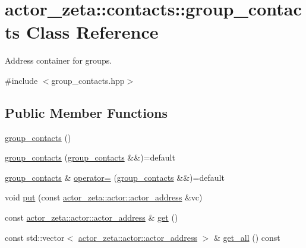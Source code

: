 \hypertarget{classactor__zeta_1_1contacts_1_1group__contacts}{}\section{actor\+\_\+zeta\+:\+:contacts\+:\+:group\+\_\+contacts Class Reference}
\label{classactor__zeta_1_1contacts_1_1group__contacts}


Address container for groups.  




{\ttfamily \#include $<$group\+\_\+contacts.\+hpp$>$}

\subsection*{Public Member Functions}
\begin{DoxyCompactItemize}
\item 
\hyperlink{classactor__zeta_1_1contacts_1_1group__contacts_a01b1a7dc05a2242d6d30a87e3e3e9ebc}{group\+\_\+contacts} ()
\item 
\hyperlink{classactor__zeta_1_1contacts_1_1group__contacts_a8dced15cc60b2e5aa63ac62902ead8c0}{group\+\_\+contacts} (\hyperlink{classactor__zeta_1_1contacts_1_1group__contacts}{group\+\_\+contacts} \&\&)=default
\item 
\hyperlink{classactor__zeta_1_1contacts_1_1group__contacts}{group\+\_\+contacts} \& \hyperlink{classactor__zeta_1_1contacts_1_1group__contacts_ae52bb816fc7f87a929fd78c7fc1304d4}{operator=} (\hyperlink{classactor__zeta_1_1contacts_1_1group__contacts}{group\+\_\+contacts} \&\&)=default
\item 
void \hyperlink{classactor__zeta_1_1contacts_1_1group__contacts_a3f3df67c28107e37cd14669e86139da2}{put} (const \hyperlink{classactor__zeta_1_1actor_1_1actor__address}{actor\+\_\+zeta\+::actor\+::actor\+\_\+address} \&vc)
\item 
const \hyperlink{classactor__zeta_1_1actor_1_1actor__address}{actor\+\_\+zeta\+::actor\+::actor\+\_\+address} \& \hyperlink{classactor__zeta_1_1contacts_1_1group__contacts_a055ef40b0af97682460575a05234fa8a}{get} ()
\item 
const std\+::vector$<$ \hyperlink{classactor__zeta_1_1actor_1_1actor__address}{actor\+\_\+zeta\+::actor\+::actor\+\_\+address} $>$ \& \hyperlink{classactor__zeta_1_1contacts_1_1group__contacts_aa78c4ae1129cb60e39e9b26210681784}{get\+\_\+all} () const
\end{DoxyCompactItemize}


